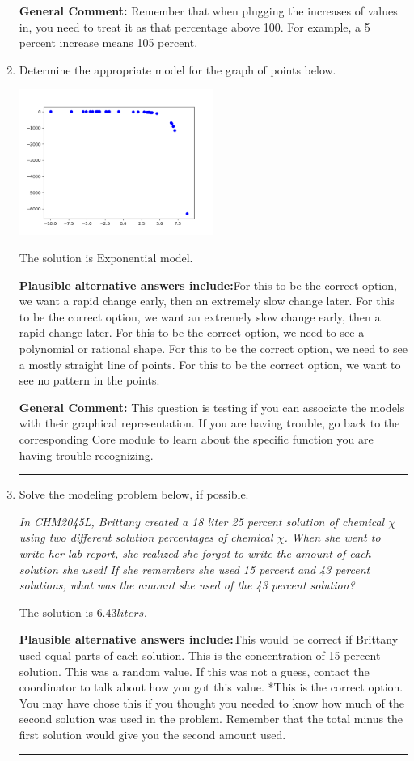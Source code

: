 \documentclass{extbook}[14pt]
\newcommand{\litem}[1]{\item #1

\rule{\textwidth}{0.4pt}}
\begin{document}
\begin{enumerate}
{\textbf{General Comment:} Remember that when plugging the increases of values in, you need to treat it as that percentage above 100. For example, a 5 percent increase means 105 percent.
}
\litem{
Determine the appropriate model for the graph of points below.

\begin{center}
    \includegraphics[width=0.5\textwidth]{../Figures/identifyModelGraph12C.png}
\end{center}


The solution is \( \text{Exponential model} \).\begin{enumerate}[label=\Alph*.]
\textbf{Plausible alternative answers include:}For this to be the correct option, we want a rapid change early, then an extremely slow change later.
For this to be the correct option, we want an extremely slow change early, then a rapid change later.
For this to be the correct option, we need to see a polynomial or rational shape.
For this to be the correct option, we need to see a mostly straight line of points.
For this to be the correct option, we want to see no pattern in the points.
\end{enumerate}

\textbf{General Comment:} This question is testing if you can associate the models with their graphical representation. If you are having trouble, go back to the corresponding Core module to learn about the specific function you are having trouble recognizing.
}
\litem{
Solve the modeling problem below, if possible.

\begin{center}
    \textit{ In CHM2045L, Brittany created a 18 liter 25 percent solution of chemical $\chi$ using two different solution percentages of chemical $\chi$. When she went to write her lab report, she realized she forgot to write the amount of each solution she used! If she remembers she used 15 percent and 43 percent solutions, what was the amount she used of the 43 percent solution? }
\end{center}
The solution is \( 6.43 liters \).\begin{enumerate}[label=\Alph*.]
\textbf{Plausible alternative answers include:}This would be correct if Brittany used equal parts of each solution.
This is the concentration of 15 percent solution.
This was a random value. If this was not a guess, contact the coordinator to talk about how you got this value.
*This is the correct option.
You may have chose this if you thought you needed to know how much of the second solution was used in the problem. Remember that the total minus the first solution would give you the second amount used.
\end{enumerate}

}
\end{enumerate}
\end{document}
